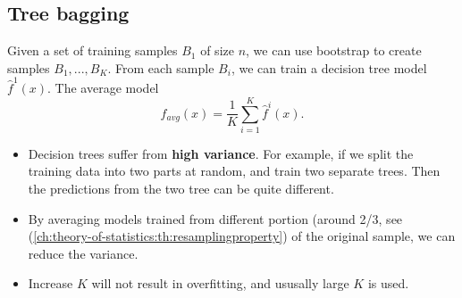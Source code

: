 \begin{refsection}
\subsection{Tree bagging}
\begin{definition}[bagging]
	Given a set of training samples $B_1$ of size $n$, we can use bootstrap to create samples $B_1,...,B_K$. From each sample $B_i$, we can train a decision tree model $\hat{f}^1(x)$. The average model 
	$$\hat{f}_{avg}(x) = \frac{1}{K}\sum_{i=1}^K \hat{f}^i(x).$$
\end{definition}


\begin{remark}\hfill
	\begin{itemize}
		\item Decision trees suffer from \textbf{high variance}. For example, if we split the training data into two parts at random, and train two separate trees. Then the predictions from the two tree can be quite different. 
		\item By averaging models trained from different portion (around 2/3, see (\autoref{ch:theory-of-statistics:th:resamplingproperty}) of the original sample, we can reduce the variance. 
		\item Increase $K$ will not result in overfitting, and ususally large $K$ is used. 
	\end{itemize}
\end{remark}



\end{refsection}
